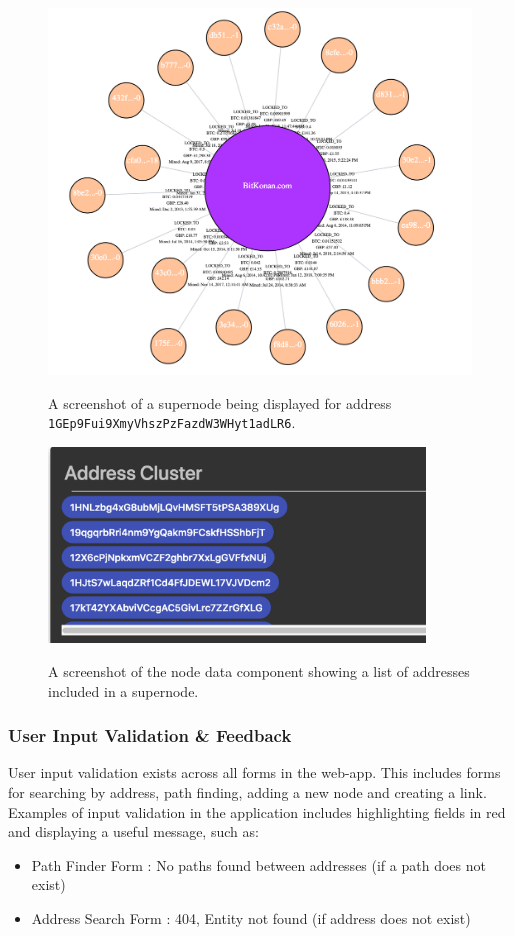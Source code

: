 \begin{figure}[h!]
  \centering
  \includegraphics[width = 15cm]{./figures/ui-screenshots/entity-tagging-supernode}\\[0.5cm] 
  \caption{A screenshot of a supernode being displayed for address \texttt{1GEp9Fui9XmyVhszPzFazdW3WHyt1adLR6}.}
  \label{fig:entity-tagging-supernode}
\end{figure}

\begin{figure}[h!]
  \centering
  \includegraphics[width = 10cm]{./figures/ui-screenshots/supernode-address-list}\\[0.5cm] 
  \caption{A screenshot of the node data component showing a list of addresses included in a supernode.}
  \label{fig:entity-tagging-supernode-address-list}
\end{figure}

\subsubsection{User Input Validation \& Feedback}
User input validation exists across all forms in the web-app. This includes forms for searching by address, path finding, adding a new node and creating a link. Examples of input validation in the application includes highlighting fields in red and displaying a useful message, such as:
\begin{itemize}
    \item Path Finder Form : No paths found between addresses (if a path does not exist)
    \item Address Search Form : 404, Entity not found (if address does not exist)
\end{itemize}

